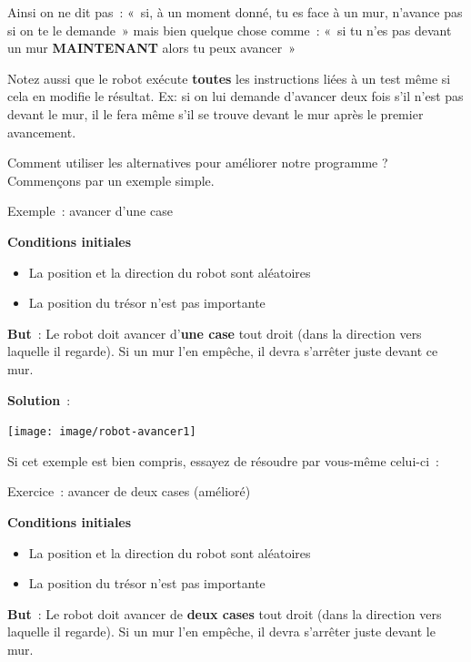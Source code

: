 	Ainsi on ne dit pas~: «~si, à un moment donné, tu es face à un mur,
	n'avance pas si on te le demande~» mais bien quelque
	chose comme~: «~si tu n'es pas devant un mur
	\textbf{MAINTENANT} alors tu peux avancer~»

	Notez aussi que le robot exécute \textbf{toutes} les instructions liées
	à un test même si cela en modifie le résultat. Ex: si on lui demande
	d'avancer deux fois s'il
	n'est pas devant le mur, il le fera même
	s'il se trouve devant le mur après le premier
	avancement.

	Comment utiliser les alternatives pour améliorer notre programme ?
	Commençons par un exemple simple.

	
	\begin{Emphase}[exercice]{Exemple~: avancer d'une case}

		\textbf{Conditions initiales}

		\begin{itemize}
		\item La position et la direction du robot sont aléatoires
		\item La position du trésor n'est pas importante
		\end{itemize}
		
		\textbf{But}~: Le robot doit avancer d'\textbf{une
		case} tout droit (dans la direction vers laquelle il regarde). 
		Si un mur l'en empêche, il devra s'arrêter juste devant ce mur.

		\textbf{Solution}~: 
		
		\texttt{[image: image/robot-avancer1]}

	\end{Emphase}
	
	Si cet exemple est bien compris, 
	essayez de résoudre par vous-même celui-ci~:

	
	\begin{Emphase}[exercice]{Exercice~: avancer de deux cases (amélioré)}

		\textbf{Conditions initiales}

		\begin{itemize}
		\item La position et la direction du robot sont aléatoires
		\item La position du trésor n'est pas importante
		\end{itemize}
		
		\textbf{But}~: Le robot doit avancer de \textbf{deux cases} tout droit
		(dans la direction vers laquelle il regarde). Si un mur
		l'en empêche, il devra s'arrêter
		juste devant le mur.

	\end{Emphase}

